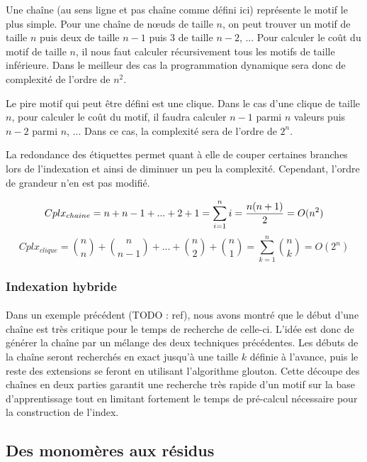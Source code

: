 \documentclass[12pt,french,twoside]{report}
\begin{document}
Une chaîne (au sens ligne et pas chaîne comme défini ici) représente le motif le plus simple. Pour une chaîne de n\oe{}uds de taille 
$n$, on peut trouver un motif de taille $n$ puis deux de taille $n-1$ puis 3 de taille $n-2$, ... Pour calculer le coût du motif
de taille $n$, il nous faut calculer récursivement tous les motifs de taille inférieure. Dans le meilleur des cas la programmation
dynamique sera donc de complexité de l'ordre de $n^2$.

Le pire motif qui peut être défini est une clique. Dans le cas d'une clique de taille $n$, pour calculer le coût du motif, il faudra
calculer $n-1$ parmi $n$ valeurs puis $n-2$ parmi $n$, ... Dans ce cas, la complexité sera de l'ordre de $2^n$.

La redondance des étiquettes permet quant à elle de couper certaines branches lors de l'indexation et ainsi de diminuer un peu
la complexité. Cependant, l'ordre de grandeur n'en est pas modifié.

\begin{equation}
 Cplx_{chaine} = n + n-1 + ... + 2 + 1 = \sum_{i=1}^n i = {{n (n+1)} \over 2} = O(n^2)
\end{equation}
\begin{equation}
 Cplx_{clique} = {n \choose n} + {n \choose n-1} + ... + {n \choose 2} + {n \choose 1} = \sum_{k=1}^n {n \choose k} = O(2^n)
\end{equation}


\subsubsection{Indexation hybride}

\paragraph{}Dans un exemple précédent (TODO : ref), nous avons montré que le début d'une chaîne est très critique pour le temps
de recherche de celle-ci. L'idée est donc de générer la chaîne par un mélange des deux techniques précédentes. Les débuts de la 
chaîne seront recherchés en exact jusqu'à une taille $k$ définie à l'avance, puis le reste des extensions se feront en
utilisant l'algorithme glouton. Cette découpe des chaînes en deux parties garantit une recherche très rapide d'un
motif sur la base d'apprentissage tout en limitant fortement le temps de pré-calcul nécessaire pour la construction de l'index.



\subsection{Des monomères aux résidus}
\end{document}
